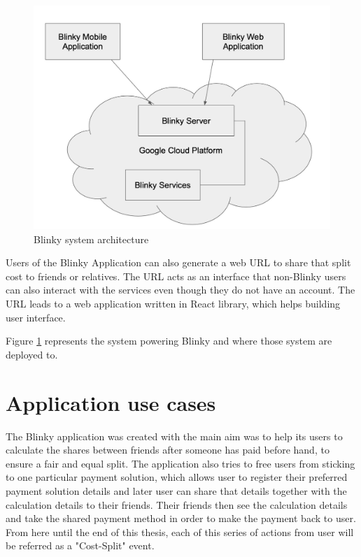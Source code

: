 \documentclass[twoside,numperchapter]{tutthesis} %
\begin{document}
\begin{figure}
    \centering
    \includegraphics[width=\linewidth]{blinky_system_architecture.jpg}
    \caption{Blinky system architecture}
    \label{fig:blinky_system}
\end{figure}

Users of the Blinky Application can also generate a web URL to share that split cost to friends or relatives. The URL acts as an interface that non-Blinky users can also interact with the services even though they do not have an account. The URL leads to a web application written in React library, which helps building user interface.

Figure \ref{fig:blinky_system} represents the system powering Blinky and where those system are deployed to. 

\section{Application use cases}

The Blinky application was created with the main aim was to help its users to calculate the shares between friends after someone has paid before hand, to ensure a fair and equal split. The application also tries to free users from sticking to one particular payment solution, which allows user to register their preferred payment solution details and later user can share that details together with the calculation details to their friends. Their friends then see the calculation details and take the shared payment method in order to make the payment back to user. From here until the end of this thesis, each of this series of actions from user will be referred as a "Cost-Split" event.
\end{document}
